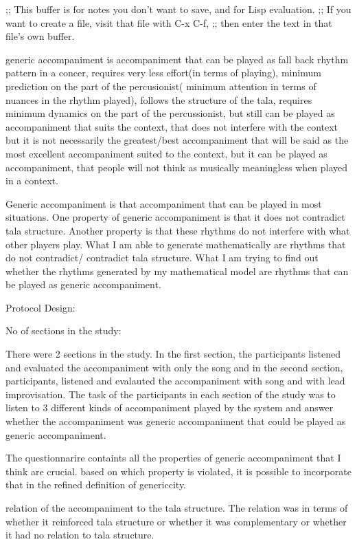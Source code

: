 ;; This buffer is for notes you don't want to save, and for Lisp evaluation.
;; If you want to create a file, visit that file with C-x C-f,
;; then enter the text in that file's own buffer.

generic accompaniment is accompaniment that can be played as fall back rhythm pattern in a concer, requires very less effort(in terms of playing), minimum prediction on the part of the percusionist( minimum attention in terms of nuances in the rhythm played), follows the structure of the tala, requires minimum dynamics on the part of the percussionist, but still can be played as accompaniment that suits the context, that does not interfere with the context but it is not necessarily the greatest/best accompaniment that will be said as the most excellent accompaniment suited to the context, but it can be played as accompaniment, that people will not think as musically meaningless when played in a context.

Generic accompaniment is that accompaniment that can be played in most situations. One property of generic accompaniment is that it does not contradict tala structure. Another property is that these rhythms do not interfere with what other players play. What I am able to generate mathematically are rhythms that do not contradict/ contradict tala structure. What I am trying to find out whether the rhythms generated by my mathematical model are rhythms that can be played as generic accompaniment.

Protocol Design:

No of sections in the study:

There were 2 sections in the study. In the first section, the participants listened and evaluated the accompaniment with only the song and in the second section, participants, listened and evalauted the accompaniment with song and with lead improvisation. The task of the participants in each section of the study was to listen to 3 different kinds of accompaniment played by the system and answer whether the accompaniment was generic accompaniment that could be played as generic accompaniment. 


The questionnarire containts all the properties of generic accompaniment that I think are crucial. based on which property is violated, it is possible to incorporate that in the refined definition of genericcity.

relation of the accompaniment to the tala structure. The relation was in terms of whether it reinforced tala structure or whether it was complementary or whether it had no relation to tala structure.

